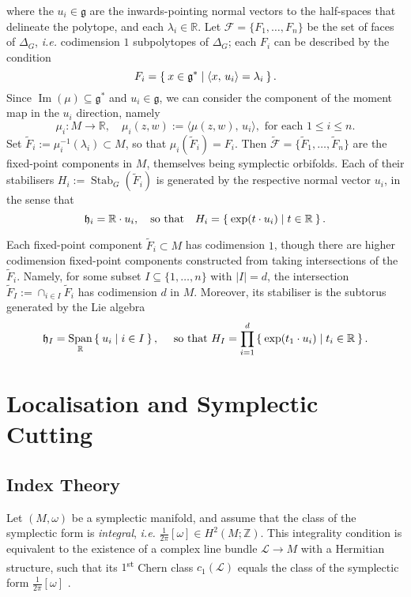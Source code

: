 \documentclass{amsart}
\newcommand{\ie}{\emph{i.e.} }
\newcommand{\ra}{\rightarrow}
\newcommand{\w}{\omega}
\newcommand{\RR}{\mathbb{R}}
\newcommand{\ZZ}{\mathbb{Z}}
\newcommand{\mcF}{\mathcal{F}}
\newcommand{\mcL}{\mathcal{L}}
\newcommand{\mfg}{\mathfrak{g}}
\newcommand{\mfh}{\mathfrak{h}}
\DeclareMathOperator{\Image}{Im}
\DeclareMathOperator{\Span}{Span}
\DeclareMathOperator{\Stab}{Stab}
\begin{document}
    where the $u_{i} \in \mfg$ are the inwards-pointing normal vectors to the half-spaces that delineate the polytope, and each $\lambda_{i} \in \mathbb{R}$. Let $\mcF = \{ F_{1}, \ldots, F_{n}\}$ be the set of faces of $\Delta_{G}$, \ie codimension $1$ subpolytopes of $\Delta_{G}$; each $F_{i}$ can be described by the condition
    \[
        F_{i} = \Set{ x \in \mfg^{\ast} | \langle x,\, u_{i} \rangle = \lambda_{i} }.
    \]
    Since $\Image(\mu) \subseteq \mfg^{\ast}$ and $u_{i} \in \mfg$, we can consider the component of the moment map in the $u_{i}$ direction, namely
    \[
        \mu_{i} : M \ra \RR, \quad \mu_{i}(z,w) := \langle \mu(z,w),\, u_{i} \rangle, \text{ for each } 1 \leq i \leq n.
    \]
    Set $\tilde{F}_{i} := \mu_{i}^{-1}(\lambda_{i}) \subset M$, so that $\mu_{i}(\tilde{F}_{i}) = F_{i}$. Then $\tilde{\mcF} = \{\tilde{F}_{1}, \ldots, \tilde{F}_{n}\}$ are the fixed-point components in $M$, themselves being symplectic orbifolds. Each of their stabilisers $H_{i} := \Stab_{G}(\tilde{F}_{i})$ is generated by the respective normal vector $u_{i}$, in the sense that
    \[
    	\mfh_{i} = \RR\cdot u_{i}, \quad \text{so that} \quad H_{i} = \Set{\exp(t\cdot u_{i}) | t \in \RR}.
    \]
    
    Each fixed-point component $\tilde{F}_{i} \subset M$ has codimension $1$, though there are higher codimension fixed-point components constructed from taking intersections of the $\tilde{F}_{i}$. Namely, for some subset $I \subseteq \{1, \ldots, n\}$ with $|I| = d$, the intersection $\tilde{F}_{I} := \cap_{i \in I} \tilde{F}_{i}$ has codimension $d$ in $M$. Moreover, its stabiliser is the subtorus generated by the Lie algebra
    \[
    	\mfh_{I} = \Span_{\RR}\Set{u_{i} | i \in I}, \quad \text{ so that } H_{I} = \prod_{i=1}^{d}\Set{\exp(t_{1}\cdot u_{i}) | t_{i} \in \RR }.
    \]
    	
	\section{Localisation and Symplectic Cutting}
	
	\subsection{Index Theory}
	
	Let $(M, \w)$ be a symplectic manifold, and assume that the class of the symplectic form is \emph{integral}, \ie $\tfrac{1}{2\pi}[\w] \in H^{2}(M; \ZZ)$. This integrality condition is equivalent to the existence of a complex line bundle $\mcL \ra M$ with a Hermitian structure, such that its $1$\textsuperscript{st} Chern class $c_{1}(\mcL)$ equals the class of the symplectic form $\tfrac{1}{2\pi}[\w]$ \cite{Duistermaat2011}.
	
\end{document}
